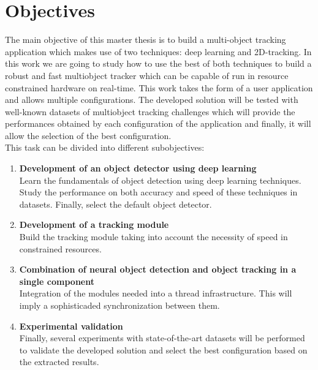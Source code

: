 \section{Objectives}
The main objective of this master thesis is to build a multi-object tracking application which makes use of two techniques: deep learning and 2D-tracking. In this work we are going to study how to use the best of both techniques to build a robust and fast multiobject tracker which can be capable of run in resource constrained hardware on real-time. This work takes the form of a user application and allows multiple configurations. The developed solution will be tested with well-known datasets of multiobject tracking challenges which will provide the performances obtained by each configuration of the application and finally, it will allow the selection of the best configuration.\\
This task can be divided into different subobjectives:
\begin{enumerate}
\item \textbf{Development of an object detector using deep learning}\\
Learn the fundamentals of object detection using deep learning techniques. Study the performance on both accuracy and speed of these techniques in datasets. Finally, select the default object detector.
\item \textbf{Development of a tracking module}\\
Build the tracking module taking into account the necessity of speed in constrained resources.
\item \textbf{Combination of neural object detection and object tracking in a single component}\\
Integration of the modules needed into a thread infrastructure. This will imply a sophisticaded synchronization between them.
\item \textbf{Experimental validation}\\
Finally, several experiments with state-of-the-art datasets will be performed to validate the developed solution and select the best configuration based on the extracted results.
\end{enumerate}

